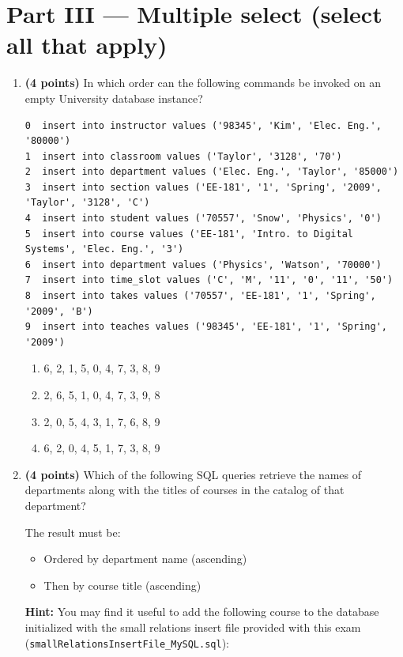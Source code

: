 \documentclass{article}
\begin{document}
\section*{Part III — Multiple select (select all that apply)}
\begin{enumerate}

  \item \textbf{(4 points)} In which order can the following commands be invoked on an empty University database instance?

\begin{verbatim}
0  insert into instructor values ('98345', 'Kim', 'Elec. Eng.', '80000')
1  insert into classroom values ('Taylor', '3128', '70')
2  insert into department values ('Elec. Eng.', 'Taylor', '85000')
3  insert into section values ('EE-181', '1', 'Spring', '2009', 'Taylor', '3128', 'C')
4  insert into student values ('70557', 'Snow', 'Physics', '0')
5  insert into course values ('EE-181', 'Intro. to Digital Systems', 'Elec. Eng.', '3')
6  insert into department values ('Physics', 'Watson', '70000')
7  insert into time_slot values ('C', 'M', '11', '0', '11', '50')
8  insert into takes values ('70557', 'EE-181', '1', 'Spring', '2009', 'B')
9  insert into teaches values ('98345', 'EE-181', '1', 'Spring', '2009')
\end{verbatim}

  \begin{enumerate}
    \item[(A)] 6, 2, 1, 5, 0, 4, 7, 3, 8, 9
    \item[(B)] 2, 6, 5, 1, 0, 4, 7, 3, 9, 8
    \item[(C)] 2, 0, 5, 4, 3, 1, 7, 6, 8, 9
    \item[(D)] 6, 2, 0, 4, 5, 1, 7, 3, 8, 9
  \end{enumerate}




  \item \textbf{(4 points)} Which of the following SQL queries retrieve the names of departments
along with the titles of courses in the catalog of that department?

The result must be:
\begin{itemize}
    \item Ordered by department name (ascending)
    \item Then by course title (ascending)
\end{itemize}

\textbf{Hint:} You may find it useful to add the following course to the database
initialized with the small relations insert file provided with this exam
(\texttt{smallRelationsInsertFile\_MySQL.sql}):


\end{enumerate}
\end{document}
